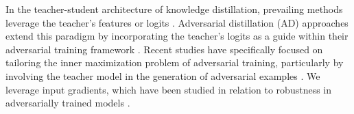 \documentclass{article} %
\begin{document}
In the teacher-student architecture of knowledge distillation, prevailing methods leverage the teacher's features or logits \citep{hinton2015distilling, ji2021show, kim2021feature, yang2022focal}. Adversarial distillation (AD) approaches extend this paradigm by incorporating the teacher's logits as a guide within their adversarial training framework \citep{ard, iad, akd}. Recent studies have specifically focused on tailoring the inner maximization problem of adversarial training, particularly by involving the teacher model in the generation of adversarial examples \citep{rslad, adaad}.
We leverage input gradients, which have been studied in relation to robustness in adversarially trained models \citep{tsipras2018robustness, engstrom2019adversarial, srinivas2023models}.

\end{document}

